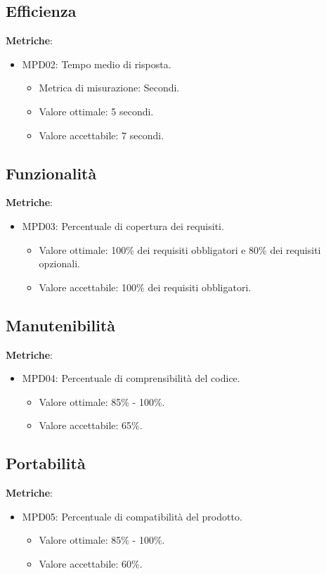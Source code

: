 \documentclass[12pt]{article}
\begin{document}
\subsection{Efficienza}
\textbf{Metriche}:
\begin{itemize}
	\item MPD02: Tempo medio di risposta.
	      \begin{itemize}
		      \item Metrica di misurazione: Secondi.
		      \item Valore ottimale: 5 secondi.
		      \item Valore accettabile: 7 secondi.
	      \end{itemize}
\end{itemize}

\subsection{Funzionalità}
\textbf{Metriche}:
\begin{itemize}
	\item MPD03: Percentuale di copertura dei requisiti.
	      \begin{itemize}
		      \item Valore ottimale: 100\% dei requisiti obbligatori e 80\% dei requisiti opzionali.
		      \item Valore accettabile: 100\% dei requisiti obbligatori.
	      \end{itemize}
\end{itemize}

\subsection{Manutenibilità}
\textbf{Metriche}:
\begin{itemize}
	\item MPD04: Percentuale di comprensibilità del codice.
	      \begin{itemize}
		      \item Valore ottimale: 85\% - 100\%.
		      \item Valore accettabile: 65\%.
	      \end{itemize}
\end{itemize}


\subsection{Portabilità}
\textbf{Metriche}:
\begin{itemize}
	\item MPD05: Percentuale di compatibilità del prodotto.
	      \begin{itemize}
		      \item Valore ottimale: 85\% - 100\%.
		      \item Valore accettabile: 60\%.
	      \end{itemize}
\end{itemize}
\end{document}

